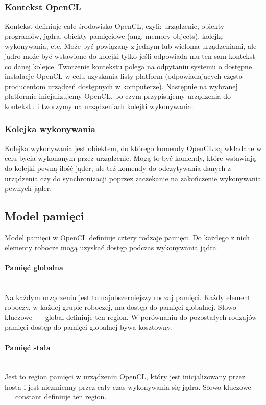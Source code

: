 \documentclass[polish, 12pt]{aghthesis}
\begin{document}
	\clearpage
	\subsubsection{Kontekst OpenCL}
		Kontekst definiuje całe środowisko OpenCL, czyli: urządzenie, obiekty programów, jądra, obiekty pamięciowe (ang. memory objects), kolejkę wykonywania, etc. Może być powiązany z jednym lub wieloma urządzeniami, ale jądro może być wstawione do kolejki tylko jeśli odpowiada mu ten sam kontekst co danej kolejce.
		Tworzenie kontekstu polega na odpytaniu systemu o dostępne instalacje OpenCL w celu uzyskania listy platform (odpowiadających często producentom urządzeń dostępnych w komputerze). Następnie na wybranej platformie inicjalizujemy OpenCL, po czym przypisujemy urządzenia do kontekstu i tworzymy na urządzeniach kolejki wykonywania.
		
	\subsubsection{Kolejka wykonywania}
	Kolejka wykonywania jest obiektem, do którego komendy OpenCL są wkładane w celu bycia wykonanym przez urządzenie. Mogą to być komendy, które wstawiają do kolejki pewną ilość jąder, ale też komendy do odczytywania danych z urządzenia czy do synchronizacji poprzez zaczekanie na zakończenie wykonywania pewnych jąder.
	
	\subsection{Model pamięci}
	
	Model pamięci w OpenCL definiuje cztery rodzaje pamięci. Do każdego z nich elementy robocze mogą uzyskać dostęp podczas wykonywania jądra. 
	
	\paragraph{Pamięć globalna}\ \\
		Na każdym urządzeniu jest to najobszerniejszy rodzaj pamięci. Każdy element roboczy, w każdej grupie roboczej, ma dostęp do pamięci globalnej. Słowo kluczowe \_\_global definiuje ten region. W porównaniu do pozostałych rodzajów pamięci dostęp do pamięci globalnej bywa kosztowny.
	\paragraph{Pamięć stała}\ \\
		Jest to region pamięci w urządzeniu OpenCL, który jest inicjalizowany przez hosta i jest niezmienny przez cały czas wykonywania się jądra. Słowo kluczowe \_\_constant definiuje ten region.
\end{document}

